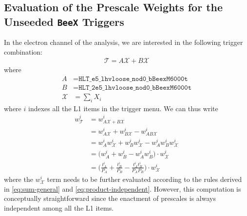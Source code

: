 \subsection{Evaluation of the Prescale Weights for the Unseeded \texttt{BeeX} Triggers}
In the electron channel of the analysis, we are interested in the following trigger combination:
\begin{align}
    \mathcal{T}=A\mathcal{X}+B\mathcal{X}
\end{align}
where \begin{align}
    A&=\texttt{HLT\_e5\_lhvloose\_nod0\_bBeexM6000t}\\
    B&=\texttt{HLT\_2e5\_lhvloose\_nod0\_bBeexM6000t}\\
    \mathcal{X}&=\sum_i X_i
\end{align}
where $i$ indexes all the L1 items in the trigger menu. We can thus write 
\begin{align}
    w^i_{\mathcal{T}}&=w^i_{A\mathcal{X}+B\mathcal{X}}\\
    &=w^i_{A\mathcal{X}}+w^i_{B\mathcal{X}}-w^i_{AB\mathcal{X}}\\
    &=w^i_{A}w^i_{\mathcal{X}}+w^i_{B}w^i_{\mathcal{X}}-w^i_Aw^i_Bw^i_{\mathcal{X}}\\
    &=\big(w^i_{A}+w^i_{B}-w^i_Aw^i_B\big)\cdot w^i_{\mathcal{X}}\\
    &=\bigg(\frac{t^i_A}{P_A}+\frac{t^i_B}{P_B}-\frac{t^i_At^i_B}{P_AP_B}\bigg)\cdot w^i_{\mathcal{X}}
\end{align}
where the $w^i_{\mathcal{X}}$ term needs to be further evaluated according to the rules derived in \eqref{eq:sum-general} and \eqref{eq:product-independent}. %
However, this computation is conceptually straightforward since the enactment of prescales is always independent among all the L1 items. %
